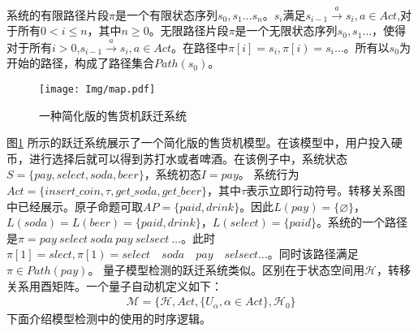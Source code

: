 系统的有限路径片段\(\pi\)是一个有限状态序列\(s_0,s_1\ldots s_n\)。\(s_i\)满足\(s_{i-1}\overset{a}{\rightarrow}s_i,a\in Act\),对于所有\(0<i\leq n\)，其中\(n\geq 0 \)。无限路径片段\(\pi\)是一个无限状态序列\(s_0,s_1\ldots\)，使得对于所有\(i>0\),\(s_{i-1} \overset{a}{\rightarrow}  s_i,a\in Act\)。在路径中\(\pi\left[i\right]=s_i,\pi\left[i\right)=s_i\ldots\)。所有以\(s_0\)为开始的路径，构成了路径集合\(Path\left(s_0\right)\)。

\begin{figure}[!htbp]
    \centering
    \texttt{[image: Img/map.pdf]}
    \caption{一种简化版的售货机跃迁系统}
    \label{fig:transition-system}
\end{figure}

图\ref{fig:transition-system} 所示的跃迁系统展示了一个简化版的售货机模型。在该模型中，用户投入硬币，进行选择后就可以得到苏打水或者啤酒。在该例子中，系统状态\(S=\{pay,select,soda,beer\}\)，系统初态\(I=pay\)。
系统行为\(Act=\{insert\_coin,\tau,get\_soda,get\_beer\}\)，其中\(\tau\)表示立即行动符号。转移关系图中已经展示。原子命题可取\(AP=\{paid,drink\}\)。因此\(L\left( pay \right)=\{\varnothing\}\)，\(L\left(soda\right)=L\left(beer\right)=\{paid,drink\}\)，\(L\left(select\right)=\{paid\}\)。系统的一个路径是\(\pi=pay\ select\ soda\ pay\ selsect\ \ldots\)。此时\(\pi\left[1\right]=slect,\pi\left[1\right)=select\quad soda\quad pay\quad selsect\ldots\)。同时该路径满足\(\pi\in Path\left(pay\right)\)。
量子模型检测的跃迁系统类似。区别在于状态空间用\(\mathcal{H}\)，转移关系用酉矩阵。一个量子自动机定义如下：
\begin{align}
    \mathcal{M}=\{\mathcal{H},Act,\{U_\alpha,\alpha\in Act\},\mathcal{H}_0\}
\end{align}
下面介绍模型检测中的使用的时序逻辑。

